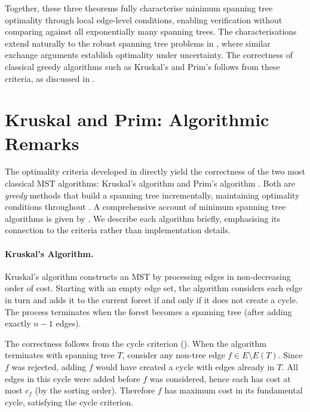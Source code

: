 Together, these three theorems fully characterise minimum spanning tree optimality through local edge-level conditions, enabling verification without comparing against all exponentially many spanning trees.
The characterisations extend naturally to the robust spanning tree problems in , where similar exchange arguments establish optimality under uncertainty.
The correctness of classical greedy algorithms such as Kruskal's and Prim's follows from these criteria, as discussed in .


% 
\section{Kruskal and Prim: Algorithmic Remarks}\label{sec:kruskal-prim}

The optimality criteria developed in  directly yield the correctness of the two most classical MST algorithms: Kruskal's algorithm \cite{Kruskal1956} and Prim's algorithm \cite{Prim1957}.
Both are \emph{greedy} methods that build a spanning tree incrementally, maintaining optimality conditions throughout \cite[Section~2.3]{BuesingOptiB2023}.
A comprehensive account of minimum spanning tree algorithms is given by \textcite[Chapter~13]{AhujaMagnantiOrlin1993}.
We describe each algorithm briefly, emphasising its connection to the criteria rather than implementation details.

\paragraph{Kruskal's Algorithm.}

Kruskal's algorithm constructs an MST by processing edges in non-decreasing order of cost.
Starting with an empty edge set, the algorithm considers each edge in turn and adds it to the current forest if and only if it does not create a cycle.
The process terminates when the forest becomes a spanning tree (after adding exactly $n - 1$ edges).

The correctness follows from the cycle criterion ().
When the algorithm terminates with spanning tree $T$, consider any non-tree edge $f \in E \setminus E(T)$.
Since $f$ was rejected, adding $f$ would have created a cycle with edges already in $T$.
All edges in this cycle were added before $f$ was considered, hence each has cost at most $c_f$ (by the sorting order).
Therefore $f$ has maximum cost in its fundamental cycle, satisfying the cycle criterion.

